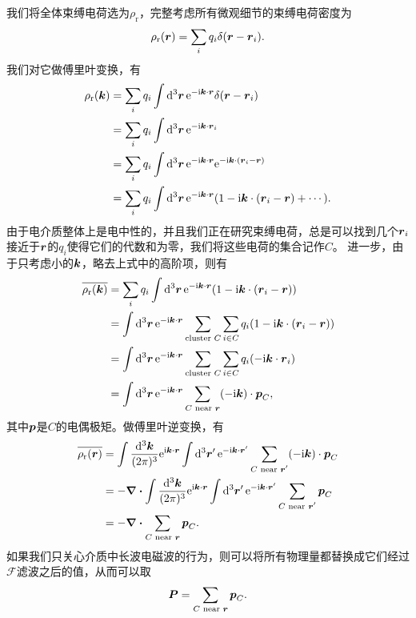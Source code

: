 我们将全体束缚电荷选为$\rho_\text{r}$，完整考虑所有微观细节的束缚电荷密度为
\[
    \rho_\text{r}(\vb*{r}) = \sum_i q_i \delta(\vb*{r} - \vb*{r}_i).
\]
我们对它做傅里叶变换，有
\[
    \begin{aligned}
        \rho_\text{r}(\vb*{k}) &= \sum_i q_i \int \dd[3]{\vb*{r}} \mathrm{e}^{- \mathrm{i} \vb*{k} \cdot \vb*{r}} \delta(\vb*{r} - \vb*{r}_i) \\
        &= \sum_i q_i \int \dd[3]{\vb*{r}} \mathrm{e}^{- \mathrm{i} \vb*{k} \cdot \vb*{r}_i} \\
        &= \sum_i q_i \int \dd[3]{\vb*{r}} \mathrm{e}^{- \mathrm{i} \vb*{k} \cdot \vb*{r}} \mathrm{e}^{- \mathrm{i} \vb*{k} \cdot (\vb*{r}_i - \vb*{r})} \\
        &= \sum_i q_i \int \dd[3]{\vb*{r}} \mathrm{e}^{- \mathrm{i} \vb*{k} \cdot \vb*{r}} (1 - \mathrm{i} \vb*{k} \cdot (\vb*{r}_i - \vb*{r}) + \cdots).
    \end{aligned}
\]
由于电介质整体上是电中性的，并且我们正在研究束缚电荷，总是可以找到几个$\vb*{r}_i$接近于$\vb*{r}$的$q_i$使得它们的代数和为零，我们将这些电荷的集合记作$C$。
进一步，由于只考虑小的$\vb*{k}$，略去上式中的高阶项，则有
\[
    \begin{aligned}
        \overline{\rho_\text{r}(\vb*{k})} &= \sum_i q_i \int \dd[3]{\vb*{r}} \mathrm{e}^{- \mathrm{i} \vb*{k} \cdot \vb*{r}} (1 - \mathrm{i} \vb*{k} \cdot (\vb*{r}_i - \vb*{r}) ) \\
        &= \int \dd[3]{\vb*{r}} \mathrm{e}^{- \mathrm{i} \vb*{k} \cdot \vb*{r}} \sum_{\text{cluster $C$}} \sum_{i \in C} q_i (1 - \mathrm{i} \vb*{k} \cdot (\vb*{r}_i - \vb*{r})) \\
        &= \int \dd[3]{\vb*{r}} \mathrm{e}^{- \mathrm{i} \vb*{k} \cdot \vb*{r}} \sum_{\text{cluster $C$}} \sum_{i \in C} q_i (- \mathrm{i} \vb*{k} \cdot \vb*{r}_i) \\
        &= \int \dd[3]{\vb*{r}} \mathrm{e}^{- \mathrm{i} \vb*{k} \cdot \vb*{r}} \sum_{\text{$C$ near $\vb*{r}$}} (- \mathrm{i} \vb*{k}) \cdot \vb*{p}_C,
    \end{aligned}
\]
其中$\vb*{p}$是$C$的电偶极矩。做傅里叶逆变换，有
\[
    \begin{aligned}
        \overline{\rho_\text{r}(\vb*{r})} &= \int \frac{\dd[3]{\vb*{k}}}{(2\pi)^3} \mathrm{e}^{\mathrm{i} \vb*{k} \cdot \vb*{r}} \int \dd[3]{\vb*{r}'} \mathrm{e}^{- \mathrm{i} \vb*{k} \cdot \vb*{r}'} \sum_{\text{$C$ near $\vb*{r}'$}} (- \mathrm{i} \vb*{k}) \cdot \vb*{p}_C \\
        &= - \div \int \frac{\dd[3]{\vb*{k}}}{(2\pi)^3} \mathrm{e}^{\mathrm{i} \vb*{k} \cdot \vb*{r}} \int \dd[3]{\vb*{r}'} \mathrm{e}^{- \mathrm{i} \vb*{k} \cdot \vb*{r}'} \sum_{\text{$C$ near $\vb*{r}'$}} \vb*{p}_C \\
        &= - \div{\sum_{\text{$C$ near $\vb*{r}$}} \vb*{p}_C}.
    \end{aligned}
\]
如果我们只关心介质中长波电磁波的行为，则可以将所有物理量都替换成它们经过$\mathcal{F}$滤波之后的值，从而可以取
\begin{equation}
    \vb*{P} = \sum_{\text{$C$ near $\vb*{r}$}} \vb*{p}_C.
\end{equation}

